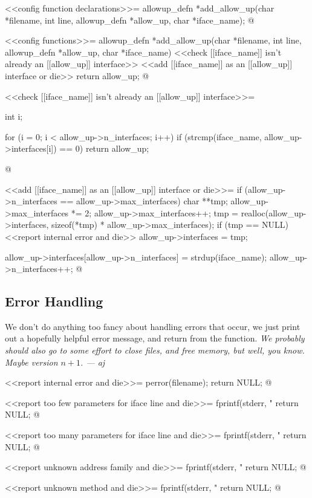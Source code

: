 \documentclass{article}
\begin{document}
<<config function declarations>>=
allowup_defn *add_allow_up(char *filename, int line,
	 allowup_defn *allow_up, char *iface_name);
@

<<config functions>>=
allowup_defn *add_allow_up(char *filename, int line,
	allowup_defn *allow_up, char *iface_name)
{
	<<check [[iface_name]] isn't already an [[allow_up]] interface>>
	<<add [[iface_name]] as an [[allow_up]] interface or die>>
	return allow_up;
}
@

<<check [[iface_name]] isn't already an [[allow_up]] interface>>=
{
	int i;

	for (i = 0; i < allow_up->n_interfaces; i++) {
		if (strcmp(iface_name, allow_up->interfaces[i]) == 0) {
			return allow_up;
		}
	}
}
@

<<add [[iface_name]] as an [[allow_up]] interface or die>>=
if (allow_up->n_interfaces == allow_up->max_interfaces) {
	char **tmp;
	allow_up->max_interfaces *= 2;
	allow_up->max_interfaces++;
	tmp = realloc(allow_up->interfaces, 
		sizeof(*tmp) * allow_up->max_interfaces);
	if (tmp == NULL) {
		<<report internal error and die>>
	}
	allow_up->interfaces = tmp;
}

allow_up->interfaces[allow_up->n_interfaces] = strdup(iface_name);
allow_up->n_interfaces++;
@

\subsection{Error Handling}

We don't do anything too fancy about handling errors that occur, we
just print out a hopefully helpful error message, and return from the
function. \emph{We probably should also go to some effort to close files,
and free memory, but well, you know. Maybe version $n+1$. --- aj}

<<report internal error and die>>=
perror(filename);
return NULL;
@ 

<<report too few parameters for iface line and die>>=
fprintf(stderr, "%
return NULL;
@

<<report too many parameters for iface line and die>>=
fprintf(stderr, "%
return NULL;
@

<<report unknown address family and die>>=
fprintf(stderr, "%
return NULL;
@

<<report unknown method and die>>=
fprintf(stderr, "%
return NULL;
@
\end{document}
